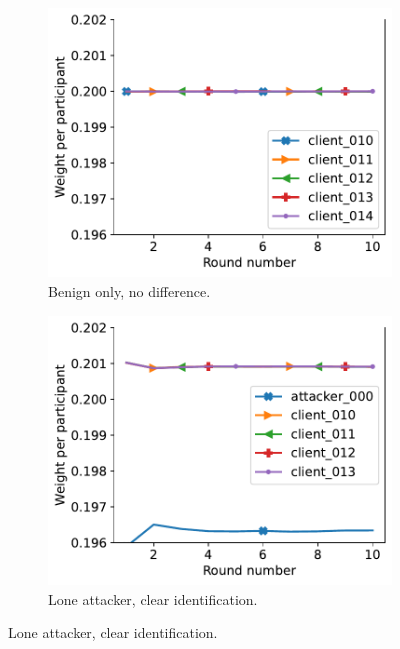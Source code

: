 \begin{figure}[!t] 
  \centering
  \begin{subfigure}[t]{0.40\linewidth}
    \centering
    \includegraphics[trim=0 0 10pt 0,clip,width=\linewidth]{figures/reput/benign_non_expanded.pdf}
    \caption{Benign only, no difference.}
    \label{fig:benign_targeted_non_expanded}
  \end{subfigure}
  \quad 
  \begin{subfigure}[t]{0.40\linewidth}
    \centering
    \includegraphics[trim=0 0 10pt 0,clip,width=\linewidth]{figures/reput/lone_loud_non_expanded.pdf}
    \caption{Lone attacker, clear identification.}
    \label{fig:lone_loud_non_expanded}
  \end{subfigure}


\end{figure}
